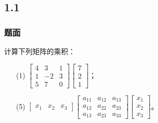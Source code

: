 \documentclass[9pt,xcolor=svgnames]{beamer} %
\begin{document}
\subsection*{1.1}
\begin{frame}
    \frametitle{题面}
    计算下列矩阵的乘积：

    \begin{enumerate}
        \item[(1)] \(\begin{bmatrix}
                  4 & 3 & 1 \\1&-2&3\\5&7&0
              \end{bmatrix}\begin{bmatrix}
                  7 \\2\\1
              \end{bmatrix}\)；
        \item[(5)] \(\begin{bmatrix}
                  x_1 & x_2 & x_3
              \end{bmatrix}
              \begin{bmatrix}
                  a_{11} & a_{12} & a_{13} \\
                  a_{12} & a_{22} & a_{23} \\
                  a_{13} & a_{23} & a_{33}
              \end{bmatrix}
              \begin{bmatrix}
                  x_1 \\x_2\\x_3
              \end{bmatrix}\)。
    \end{enumerate}
\end{frame}
\end{document}
